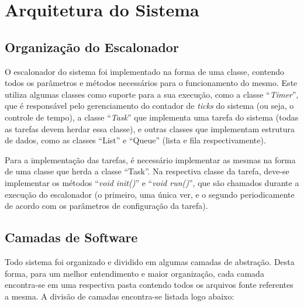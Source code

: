 %
%
%
%
%

%
%
%
%
%

\section{Arquitetura do Sistema} \label{sec:architecture}

\subsection{Organização do Escalonador}

O escalonador do sistema foi implementado na forma de uma classe, contendo todos os parâmetros e métodos necessários para o funcionamento do mesmo. Este utiliza algumas classes como suporte para a sua execução, como a classe ``\textit{Timer}'', que é responsável pelo gerenciamento do contador de \textit{ticks} do sistema (ou seja, o controle de tempo), a classe ``\textit{Task}'' que implementa uma tarefa do sistema (todas as tarefas devem herdar essa classe), e outras classes que implementam estrutura de dados, como as classes ``List'' e ``Queue'' (lista e fila respectivamente).

Para a implementação das tarefas, é necessário implementar as mesmas na forma de uma classe que herda a classe ``Task''. Na respectiva classe da tarefa, deve-se implementar os métodos ``\textit{void init()}'' e ``\textit{void run()}'', que são chamados durante a execução do escalonador (o primeiro, uma única ver, e o segundo periodicamente de acordo com os parâmetros de configuração da tarefa).

\subsection{Camadas de Software}

Todo sistema foi organizado e dividido em algumas camadas de abstração. Desta forma, para um melhor entendimento e maior organização, cada camada encontra-se em uma respectiva pasta contendo todos os arquivos fonte referentes a mesma. A divisão de camadas encontra-se listada logo abaixo:

